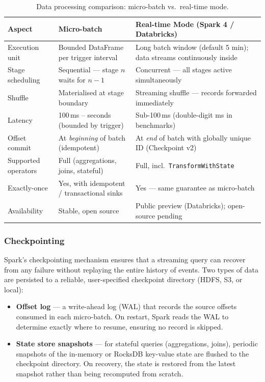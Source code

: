 \begin{table}[H]
  \centering
  \caption{Data processing comparison: micro-batch vs.\ real-time mode.}
  \label{tab:spark-processing}
  \begin{tabularx}{\textwidth}{lXX}
    \toprule
    \textbf{Aspect}        & \textbf{Micro-batch}                           & \textbf{Real-time Mode (Spark 4 / Databricks)} \\
    \midrule
    Execution unit         & Bounded DataFrame per trigger interval         & Long batch window (default 5 min); data streams continuously inside \\
    Stage scheduling       & Sequential — stage $n$ waits for $n-1$         & Concurrent — all stages active simultaneously \\
    Shuffle                & Materialised at stage boundary                 & Streaming shuffle — records forwarded immediately \\
    Latency                & 100\,ms – seconds (bounded by trigger)         & Sub-100\,ms (double-digit ms in benchmarks) \\
    Offset commit          & At \emph{beginning} of batch (idempotent)      & At \emph{end} of batch with globally unique ID (Checkpoint v2) \\
    Supported operators    & Full (aggregations, joins, stateful)           & Full, incl.\ \texttt{TransformWithState} \\
    Exactly-once           & Yes, with idempotent / transactional sinks     & Yes — same guarantee as micro-batch \\
    Availability           & Stable, open source                            & Public preview (Databricks); open-source pending \\
    \bottomrule
  \end{tabularx}
\end{table}

\subsubsection{Checkpointing}

Spark's checkpointing mechanism ensures that a streaming query can recover from any failure
without replaying the entire history of events.
Two types of data are persisted to a reliable, user-specified checkpoint directory (HDFS, S3, or local):

\begin{itemize}
  \item \textbf{Offset log} — a write-ahead log (WAL) that records the source offsets consumed in
        each micro-batch. On restart, Spark reads the WAL to determine exactly where to resume,
        ensuring no record is skipped.
  \item \textbf{State store snapshots} — for stateful queries (aggregations, joins), periodic snapshots
        of the in-memory or RocksDB key-value state are flushed to the checkpoint directory.
        On recovery, the state is restored from the latest snapshot rather than being recomputed from scratch.
\end{itemize}

